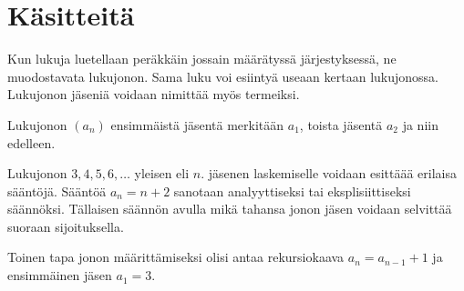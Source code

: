 \section{Käsitteitä}



Kun lukuja luetellaan peräkkäin jossain määrätyssä järjestyksessä, ne muodostavata lukujonon. Sama luku voi esiintyä useaan kertaan lukujonossa. Lukujonon jäseniä voidaan nimittää myös termeiksi.

Lukujonon $(a_n)$ ensimmäistä jäsentä merkitään $a_1$, toista jäsentä $a_2$ ja niin edelleen.

Lukujonon $3, 4, 5, 6, \ldots$ yleisen eli $n$. jäsenen laskemiselle voidaan esittäää erilaisa sääntöjä. Sääntöä $a_n=n+2$ sanotaan analyyttiseksi tai eksplisiittiseksi säännöksi. Tällaisen säännön avulla mikä tahansa jonon jäsen voidaan selvittää suoraan sijoituksella.

Toinen tapa jonon määrittämiseksi olisi antaa rekursiokaava $a_n=a_{n-1}+1$ ja ensimmäinen jäsen $a_1=3$.
